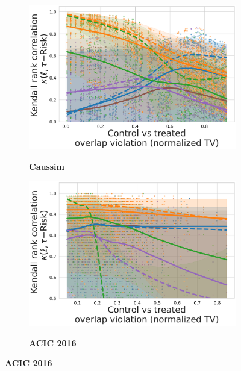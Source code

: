 \documentclass[10pt]{article}
\begin{document}
\begin{figure}
    \centering
    \begin{subfigure}[b]{0.44\textwidth}
        \centering
        \caption{\textbf{Caussim}}
        \includegraphics[width=\textwidth]{images/kendalls_tau_caussim__nuisance_non_linear__candidates_ridge__overlap_01-247.pdf}
        \label{fig:ranking_agreement_w_tau_risk_caussim}
    \end{subfigure}
    \hfill
    \begin{subfigure}[b]{0.44\textwidth}
        \centering
        \caption{\textbf{ACIC 2016}}
        \includegraphics[width=\textwidth]{images/kendalls_tau_acic_2016__nuisance_non_linear__candidates_hist_gradient_boosting__dgp_1-77__rs_1-10.pdf}
        \label{fig:ranking_agreement_tau_risk_acic_2016}
    \end{subfigure}

\end{figure}
\end{document}
